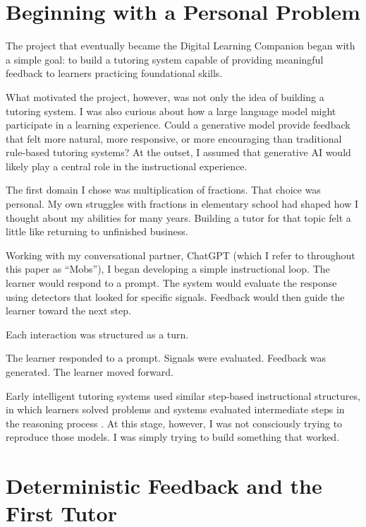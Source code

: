 \documentclass[11pt]{article}
\begin{document}

\section{Beginning with a Personal Problem}

The project that eventually became the Digital Learning Companion began with a simple goal: to build a tutoring system capable of providing meaningful feedback to learners practicing foundational skills.

What motivated the project, however, was not only the idea of building a tutoring system. I was also curious about how a large language model might participate in a learning experience. Could a generative model provide feedback that felt more natural, more responsive, or more encouraging than traditional rule-based tutoring systems? At the outset, I assumed that generative AI would likely play a central role in the instructional experience.

The first domain I chose was multiplication of fractions. That choice was personal. My own struggles with fractions in elementary school had shaped how I thought about my abilities for many years. Building a tutor for that topic felt a little like returning to unfinished business.

Working with my conversational partner, ChatGPT (which I refer to throughout this paper as “Mobs”), I began developing a simple instructional loop. The learner would respond to a prompt. The system would evaluate the response using detectors that looked for specific signals. Feedback would then guide the learner toward the next step.

Each interaction was structured as a turn.

The learner responded to a prompt. Signals were evaluated. Feedback was generated. The learner moved forward.

Early intelligent tutoring systems used similar step-based instructional structures, in which learners solved problems and systems evaluated intermediate steps in the reasoning process \citep{newell1972}. At this stage, however, I was not consciously trying to reproduce those models. I was simply trying to build something that worked.



\section{Deterministic Feedback and the First Tutor}
\end{document}
